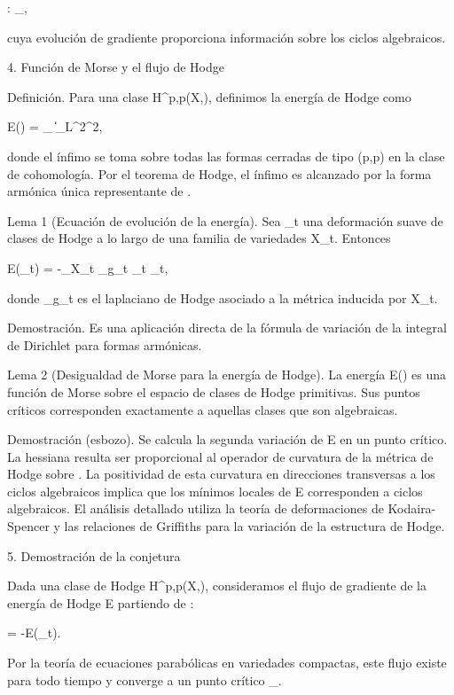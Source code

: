 \documentclass[12pt,a4paper]{book}
\begin{document}
:  \to {}_{},

cuya evolución de gradiente proporciona información sobre los ciclos algebraicos.

4. Función de Morse y el flujo de Hodge

Definición. Para una clase \alpha \in H^{p,p}(X,), definimos la energía de Hodge como

E(\alpha) = \inf_{\omega \in \alpha} \| \omega \|_{L^2}^2,

donde el ínfimo se toma sobre todas las formas cerradas de tipo (p,p) en la clase de cohomología. Por el teorema de Hodge, el ínfimo es alcanzado por la forma armónica única representante de \alpha.

Lema 1 (Ecuación de evolución de la energía). Sea \alpha_t una deformación suave de clases de Hodge a lo largo de una familia de variedades X_t. Entonces

 E(\alpha_t) = -\int_{X_t} \Delta_{g_t} \omega_t \wedge * \omega_t,

donde \Delta_{g_t} es el laplaciano de Hodge asociado a la métrica inducida por X_t.

Demostración. Es una aplicación directa de la fórmula de variación de la integral de Dirichlet para formas armónicas.

Lema 2 (Desigualdad de Morse para la energía de Hodge). La energía E(\alpha) es una función de Morse sobre el espacio de clases de Hodge primitivas. Sus puntos críticos corresponden exactamente a aquellas clases que son algebraicas.

Demostración (esbozo). Se calcula la segunda variación de E en un punto crítico. La hessiana resulta ser proporcional al operador de curvatura de la métrica de Hodge sobre . La positividad de esta curvatura en direcciones transversas a los ciclos algebraicos implica que los mínimos locales de E corresponden a ciclos algebraicos. El análisis detallado utiliza la teoría de deformaciones de Kodaira-Spencer y las relaciones de Griffiths para la variación de la estructura de Hodge.

5. Demostración de la conjetura

Dada una clase de Hodge \alpha \in H^{p,p}(X,), consideramos el flujo de gradiente de la energía de Hodge E partiendo de \alpha:

 = -\nabla E(\alpha_t).

Por la teoría de ecuaciones parabólicas en variedades compactas, este flujo existe para todo tiempo y converge a un punto crítico \alpha_\infty.
\end{document}
